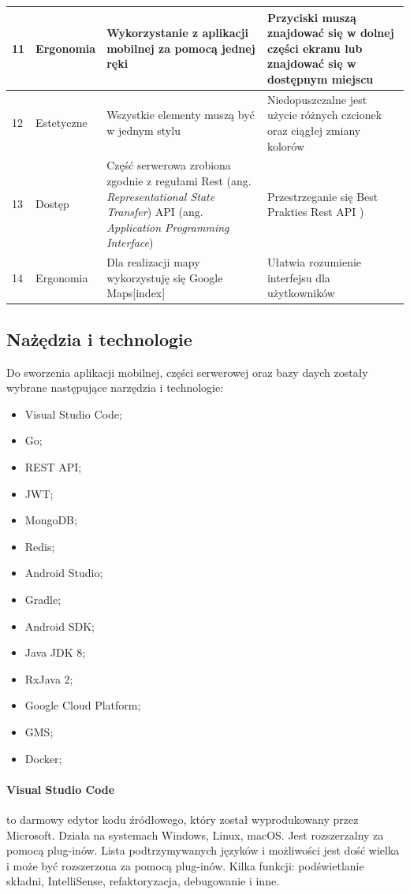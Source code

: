 \begin{table}[htb]
\begin{tabular}{| m{0.5cm} | m{3cm} | m{5.75cm} | m{5.75cm} |}
    \hline
    11 & Ergonomia & Wykorzystanie z aplikacji mobilnej za pomocą jednej ręki & Przyciski muszą znajdować się w dolnej części ekranu lub znajdować się w dostępnym miejscu \\
    \hline
    12 & Estetyczne & Wszystkie elementy muszą być w jednym stylu & Niedopuszczalne jest użycie różnych czcionek oraz ciągłej zmiany kolorów \\
    \hline
    13 & Dostęp & Część serwerowa zrobiona zgodnie z regułami Rest (ang. \textit{Representational State Transfer}) API (ang. \textit{Application Programming Interface}) & Przestrzeganie się Best Prakties Rest API \cite{rest_api_best}) \\
    \hline
    14 & Ergonomia & Dla realizacji mapy wykorzystuję się Google Maps[index] & Ułatwia rozumienie interfejsu dla użytkowników \\
    \hline
\end{tabular}
\end{table}
\newpage
\subsection{Nażędzia i technologie}
Do sworzenia aplikacji mobilnej, części serwerowej oraz bazy daych zostały wybrane następujące narzędzia i technologie:
\begin{itemize}
    \item Visual Studio Code;
    \item Go;
    \item REST API;
    \item JWT;
    \item MongoDB;
    \item Redis;
    \item Android Studio;
    \item Gradle;
    \item Android SDK;
    \item Java JDK 8;
    \item RxJava 2;
    \item Google Cloud Platform;
    \item GMS;
    \item Docker;
\end{itemize}

\paragraph{Visual Studio Code} \cite{vscode} to darmowy edytor kodu źródłowego, który został wyprodukowany przez Microsoft. Działa na systemach Windows, Linux, macOS. Jest rozszerzalny za pomocą plug-inów.
Lista podtrzymywanych języków i możliwości jest dość wielka i może być rozszerzona za pomocą plug-inów. Kilka funkcji: podświetlanie składni, IntelliSense, refaktoryzacja, debugowanie i inne.

